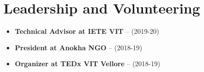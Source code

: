 \section{Leadership and Volunteering}

\vspace{1pt}

\begin{itemize}

\item \textbf{Technical Advisor at IETE VIT} -- (2019-20)
\item \textbf{President at Anokha NGO} -- (2018-19)
\item \textbf{Organizer at TEDx VIT Vellore} -- (2018-19)

\end{itemize}
